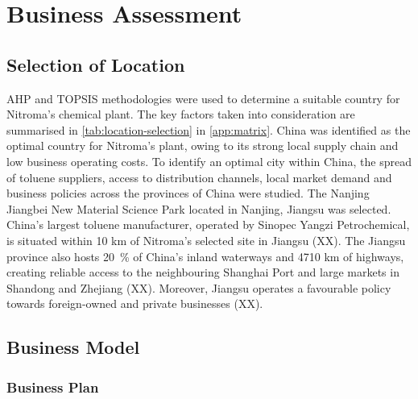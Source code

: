 \section{Business Assessment}
\label{sec:economics}
\subsection{Selection of Location} 
AHP and TOPSIS methodologies were used to determine a suitable country for Nitroma’s chemical plant. The key factors taken into consideration are summarised in \cref{tab:location-selection} in \cref{app:matrix}. China was identified as the optimal country for Nitroma's plant, owing to its strong local supply chain and low business operating costs. To identify an optimal city within China, the spread of toluene suppliers, access to distribution channels, local market demand and business policies across the provinces of China were studied. The Nanjing Jiangbei New Material Science Park located in Nanjing, Jiangsu was selected. China’s largest toluene manufacturer, operated by Sinopec Yangzi Petrochemical, is situated within 10 km of Nitroma’s selected site in Jiangsu (XX). The Jiangsu province also hosts \SI{20}{\percent} of China’s inland waterways and 4710 km of highways, creating reliable access to the neighbouring Shanghai Port and large markets in Shandong and Zhejiang (XX). Moreover, Jiangsu operates a favourable policy towards foreign-owned and private businesses (XX). 


\subsection{Business Model} 
\subsubsection{Business Plan}

